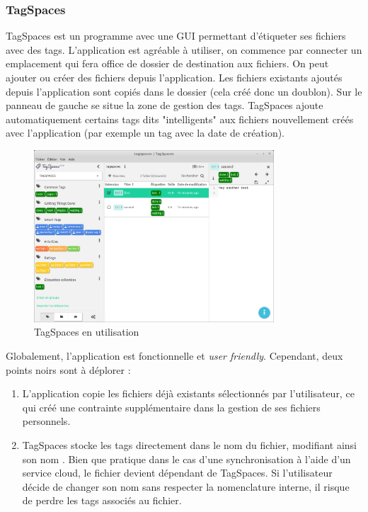 \documentclass[a4paper, 12pt]{article}
\begin{document}
\subsubsection{TagSpaces}
TagSpaces \cite{ref13} est un programme avec une GUI permettant d'étiqueter ses fichiers avec des tags. 
L'application est agréable à utiliser, on commence par connecter un emplacement qui fera office de dossier de 
destination aux fichiers. On peut ajouter ou créer des fichiers depuis l'application. Les fichiers 
existants ajoutés depuis l'application sont copiés dans le dossier (cela créé donc un doublon). 
Sur le panneau de gauche se situe la zone de gestion des tags. TagSpaces ajoute automatiquement 
certains tags dits "intelligents" aux fichiers nouvellement créés avec l'application (par exemple 
un tag avec la date de création).
\begin{figure}
    \begin{center}
        \includegraphics[width=0.8\textwidth]{images/tagspaces.png}
    \end{center}
    \caption{TagSpaces en utilisation}
    \label{tagspaces}
\end{figure}
Globalement, l'application est fonctionnelle et \textit{user friendly}. Cependant, deux points noirs 
sont à déplorer :
\begin{enumerate}
    \item L'application copie les fichiers déjà existants sélectionnés par l'utilisateur, ce qui 
        créé une contrainte supplémentaire dans la gestion de ses fichiers personnels.
    \item TagSpaces stocke les tags directement dans le nom du fichier, modifiant ainsi son nom \cite{ref14}.
        Bien que pratique dans le cas d'une synchronisation à l'aide d'un service cloud, 
        le fichier devient dépendant de TagSpaces. Si l'utilisateur décide de changer son nom sans 
        respecter la nomenclature interne, il risque de perdre les tags associés au fichier.
\end{enumerate}
\end{document}
